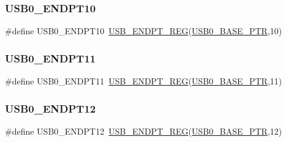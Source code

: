 \subsubsection{\texorpdfstring{U\+S\+B0\+\_\+\+E\+N\+D\+P\+T10}{USB0\_ENDPT10}}
{\footnotesize\ttfamily \#define U\+S\+B0\+\_\+\+E\+N\+D\+P\+T10~\hyperlink{group___u_s_b___register___accessor___macros_ga93e8b132ffc209ad3ba99ba2cbf4f990}{U\+S\+B\+\_\+\+E\+N\+D\+P\+T\+\_\+\+R\+EG}(\hyperlink{group___u_s_b___peripheral_ga598ff5eb20a0551af232710b3f27640a}{U\+S\+B0\+\_\+\+B\+A\+S\+E\+\_\+\+P\+TR},10)}

\mbox{\label{group___u_s_b___register___accessor___macros_gad400a35f64dff46cb6dbe51b9e46c240}} 
\subsubsection{\texorpdfstring{U\+S\+B0\+\_\+\+E\+N\+D\+P\+T11}{USB0\_ENDPT11}}
{\footnotesize\ttfamily \#define U\+S\+B0\+\_\+\+E\+N\+D\+P\+T11~\hyperlink{group___u_s_b___register___accessor___macros_ga93e8b132ffc209ad3ba99ba2cbf4f990}{U\+S\+B\+\_\+\+E\+N\+D\+P\+T\+\_\+\+R\+EG}(\hyperlink{group___u_s_b___peripheral_ga598ff5eb20a0551af232710b3f27640a}{U\+S\+B0\+\_\+\+B\+A\+S\+E\+\_\+\+P\+TR},11)}

\mbox{\label{group___u_s_b___register___accessor___macros_ga665c26ea479d38788339390bf8d14670}} 
\subsubsection{\texorpdfstring{U\+S\+B0\+\_\+\+E\+N\+D\+P\+T12}{USB0\_ENDPT12}}
{\footnotesize\ttfamily \#define U\+S\+B0\+\_\+\+E\+N\+D\+P\+T12~\hyperlink{group___u_s_b___register___accessor___macros_ga93e8b132ffc209ad3ba99ba2cbf4f990}{U\+S\+B\+\_\+\+E\+N\+D\+P\+T\+\_\+\+R\+EG}(\hyperlink{group___u_s_b___peripheral_ga598ff5eb20a0551af232710b3f27640a}{U\+S\+B0\+\_\+\+B\+A\+S\+E\+\_\+\+P\+TR},12)}

